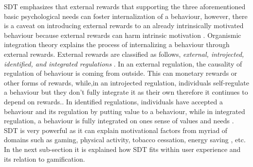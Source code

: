\documentclass{sig-alternate}
\begin{document}
SDT emphasizes that external rewards that supporting the three aforementioned basic psychological needs can foster internalization of a behaviour, however, there is a caveat on introducing external rewards to an already intrinsically motivated behaviour because external rewards can harm intrinsic motivation \cite{ryan2000:self}.\newline
Organismic integration theory explains the process of internalizing a behaviour through external rewards. External rewards are classified as follows, \emph{external, introjected, identified, and integrated regulations} \cite{ryan2000:self,lee2015:relating}. In an external regulation, the causality of  regulation of behaviour is coming from outside. This can monetary rewards or other forms of rewards, while,in an introjected regulation, individuals self-regulate a behaviour but they don't fully integrate it as their own therefore it continues to depend on rewards.\cite {lee2015:relating}. In identified  regulations, individuals have accepted a behaviour and its regulation by putting value to a behaviour, while in integrated regulation,  a behaviour is fully integrated on ones sense of values and needs \cite{lee2015:relating}.\newline 
SDT is very powerful as it can explain motivational factors from myriad of domains such as gaming\cite{ryan2006:motivationalpull}, physical activity\cite{power2011:obesity}, tobacco cessation\cite{williams2006:testing}, energy saving \cite{webb2013:self}, etc. In the next sub-section it is explained how SDT fits within user experience and its relation to gamification.  
\end{document}
